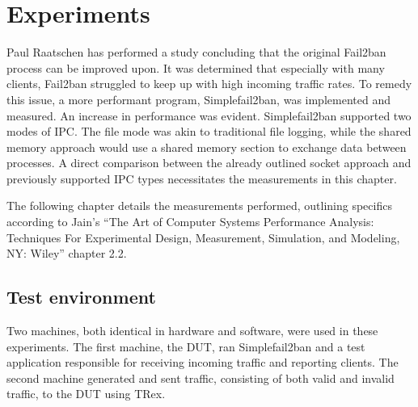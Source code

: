 %
%

\chapter{Experiments}\label{cha:experiments}
Paul Raatschen has performed a study\cite{raatschen:ipc} concluding that the original Fail2ban process can be improved upon.
It was determined that especially with many clients, Fail2ban struggled to keep up with high incoming traffic rates.
To remedy this issue, a more performant program, Simplefail2ban, was implemented and measured.
An increase in performance was evident.
Simplefail2ban supported two modes of \ac{IPC}.
The file mode was akin to traditional file logging, while the shared memory approach would use a shared memory section to exchange data between processes.
A direct comparison between the already outlined socket approach and previously supported \ac{IPC} types necessitates the measurements in this chapter.

The following chapter details the measurements performed, outlining specifics according to Jain's
``The Art of Computer Systems Performance Analysis: Techniques For Experimental Design, Measurement, Simulation, and Modeling, NY\@: Wiley''\cite{jain:measurement} chapter 2.2.

\section{Test environment}
Two machines, both identical in hardware and software, were used in these experiments.
The first machine, the \ac{DUT}, ran Simplefail2ban and a test application responsible for receiving incoming traffic and reporting clients.
The second machine generated and sent traffic, consisting of both valid and invalid traffic, to the \ac{DUT} using TRex.


